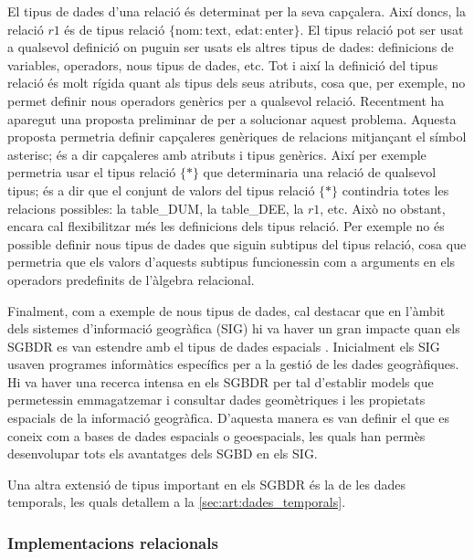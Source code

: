 El tipus de dades d'una relació és determinat per la seva capçalera.
Així doncs, la relació $r1$ és de tipus relació $\{\text{nom}:
\text{text},\, \text{edat}:\text{enter} \}$.  El tipus relació pot ser
usat a qualsevol definició on puguin ser usats els altres tipus de
dades: definicions de variables, operadors, nous tipus de dades,
etc. Tot i així la definició del tipus relació és molt rígida quant
als tipus dels seus atributs, cosa que, per exemple, no permet definir
nous operadors genèrics per a qualsevol relació.  Recentment ha
aparegut una proposta preliminar de
\textcite{darwen13:generic_relation_type} per a solucionar aquest
problema. Aquesta proposta permetria definir capçaleres genèriques de
relacions mitjançant el símbol asterisc; és a dir capçaleres amb
atributs i tipus genèrics. Així per exemple permetria usar el tipus
relació $\{ * \}$ que determinaria una relació de qualsevol tipus; és
a dir que el conjunt de valors del tipus relació $\{ * \}$ contindria
totes les relacions possibles: la table\_DUM, la table\_DEE, la $r1$,
etc. Això no obstant, encara cal flexibilitzar més les definicions
dels tipus relació. Per exemple no és possible definir nous tipus de
dades que siguin subtipus del tipus relació, cosa que permetria que
els valors d'aquests subtipus funcionessin com a arguments en els
operadors predefinits de l'àlgebra relacional.



Finalment, com a exemple de nous tipus de dades, cal destacar que en
l'àmbit dels sistemes d’informació geogràfica (SIG) hi va haver un
gran impacte quan els SGBDR es van estendre amb el tipus de dades
espacials \parencite{nunes13:icc_geospacial}.  Inicialment els SIG
usaven programes informàtics específics per a la gestió de les dades
geogràfiques. Hi va haver una recerca intensa en els SGBDR per tal
d'establir models que permetessin emmagatzemar i consultar dades
geomètriques i les propietats espacials de la informació
geogràfica. D'aquesta manera es van definir el que es coneix com a
bases de dades espacials o geoespacials, les quals han permès
desenvolupar tots els avantatges dels SGBD en els SIG. %

Una altra extensió de tipus important en els SGBDR és la de les dades
temporals, les quals detallem a la \autoref{sec:art:dades_temporals}.






\subsubsection{Implementacions relacionals}


